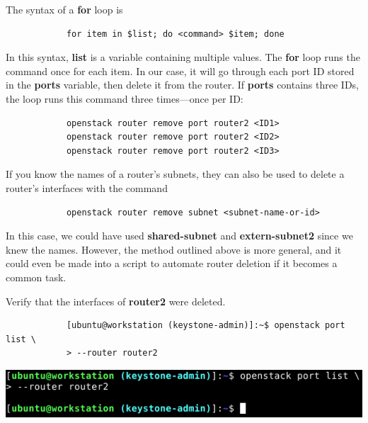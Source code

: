 \documentclass[letterpaper, 12pt]{article}
\begin{document}
\begin{enumerate}
    \begin{notebox}
        The syntax of a \textbf{for} loop is
        \begin{lstlisting}
            for item in $list; do <command> $item; done
        \end{lstlisting}
        In this syntax, \textbf{list} is a variable containing multiple values.
        The \textbf{for} loop runs the command once for each item.
        In our case, it will go through each port ID stored in the \textbf{ports} variable, then delete it from the router.
        If \textbf{ports} contains three IDs, the loop runs this command three times---once per ID:
        \begin{lstlisting}
            openstack router remove port router2 <ID1>
            openstack router remove port router2 <ID2>
            openstack router remove port router2 <ID3>
        \end{lstlisting}
    \end{notebox}
    \begin{tipbox}
        If you know the names of a router's subnets, they can also be used to delete a router's interfaces with the command
        \begin{lstlisting}
            openstack router remove subnet <subnet-name-or-id>
        \end{lstlisting}
        In this case, we could have used \textbf{shared-subnet} and \textbf{extern-subnet2} since we knew the names.
        However, the method outlined above is more general, and it could even be made into a script to automate router deletion if it becomes a common task.
    \end{tipbox}

    \begin{labstep}
        Verify that the interfaces of \textbf{router2} were deleted.
        \begin{lstlisting}
            [ubuntu@workstation (keystone-admin)]:~$ openstack port list \
            > --router router2
        \end{lstlisting}

        \begin{center}
            \includegraphics[width=\linewidth]{images/part4/step8.png}
        \end{center}
    \end{labstep}


\end{enumerate}
\end{document}
